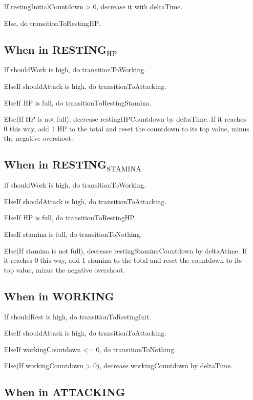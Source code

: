 \documentclass[11pt]{article}
\begin{document}
If restingInitialCountdown > 0, decrease it with deltaTime.

Else, do transitionToRestingHP.


\subsection{When in RESTING$_{\text{HP}}$}
\label{sec-2-4}

If shouldWork is high, do transitionToWorking.

ElseIf shouldAttack is high, do transitionToAttacking.

ElseIf HP is full, do transitionToRestingStamina.

Else(If HP is not full), decrease restingHPCountdown by deltaTime. If it reaches
0 this way, add 1 HP to the total and reset the countdown to its top value,
minus the negative overshoot.


\subsection{When in RESTING$_{\text{STAMINA}}$}
\label{sec-2-5}

If shouldWork is high, do transitionToWorking.

ElseIf shouldAttack is high, do transitionToAttacking.

ElseIf HP is full, do transitionToRestingHP.

ElseIf stamina is full, do transitionToNothing.

Else(If stamina is not full), decrease restingStaminaCountdown by deltaAtime. If
it reaches 0 this way, add 1 stamina to the total and reset the countdown to its
top value, minus the negative overshoot.


\subsection{When in WORKING}
\label{sec-2-6}

If shouldRest is high, do transitionToRestingInit.

ElseIf shouldAttack is high, do transitionToAttacking.

ElseIf workingCountdown <= 0, do transitionToNothing.

Else(If workingCountdown > 0), decrease workingCountdown by deltaTime.


\subsection{When in ATTACKING}
\label{sec-2-7}
\end{document}
